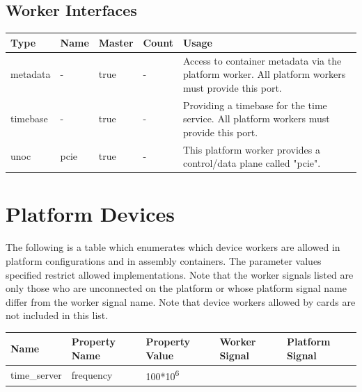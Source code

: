 \documentclass{article}
\begin{document}
\begin{landscape}
	\section*{Worker Interfaces}
	\begin{scriptsize}
		\begin{tabular}{|M{2cm}|M{2cm}|M{1.5cm}|M{1.5cm}|M{14.5cm}|}
			\hline
			Type       & Name & Master & Count & Usage                  \\
			\hline
			metadata   & -    & true   & -     & Access to container metadata via the platform worker. All platform workers must provide this port. \\
			\hline
			timebase   & -    & true   & -     & Providing a timebase for the time service. All platform workers must provide this port. \\
			\hline
			unoc       & pcie & true   & -     & This platform worker provides a control/data plane called "pcie". \\
			\hline
		\end{tabular}
	\end{scriptsize}

\end{landscape}
\pagebreak
	\section*{Platform Devices}
	The following is a table which enumerates which device workers are allowed in platform configurations and in assembly containers. The parameter values specified restrict allowed implementations. Note that the worker signals listed are only those who are unconnected on the platform or whose platform signal name differ from the worker signal name. Note that device workers allowed by cards are not included in this list.\\
			\begin{tabular}{|M{3cm}|M{3.5cm}|M{3cm}|M{3cm}|M{3cm}|}
			\hline
			Name                       & Property Name    & Property Value              & Worker Signal & Platform Signal         \\
			\hline
			time\_server               & frequency        & 100*10\textsuperscript{6}   &               &                         \\
			\hline
		\end{tabular}
\end{document}
